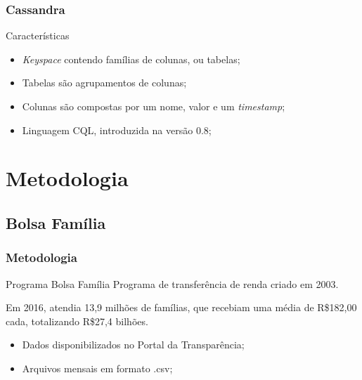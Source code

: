 \documentclass[brazil]{beamer}
\begin{document}
\begin{frame}
	\frametitle{Cassandra}
	\begin{block}{Características}
		\begin{itemize}
			\item \emph{Keyspace} contendo famílias de colunas, ou tabelas;
			\item Tabelas são agrupamentos de colunas;
			\item Colunas são compostas por um nome, valor e um \emph{timestamp}; 
			\item Linguagem CQL, introduzida na versão 0.8;
		\end{itemize}
	\end{block}
\end{frame}
\section{Metodologia}

\subsection{Bolsa Família}
\begin{frame}
	\frametitle{Metodologia}
	\begin{block}{Programa Bolsa Família}
		Programa de transferência de renda criado em 2003. 
		
		Em 2016, atendia 13,9 milhões de famílias, que recebiam uma média de R\$182,00 cada, totalizando R\$27,4 bilhões.
		
		\begin{itemize}
			\item Dados disponibilizados no Portal da Transparência;
			\item Arquivos mensais em formato .csv;
		\end{itemize}
	\end{block}
\end{frame}
\end{document}
